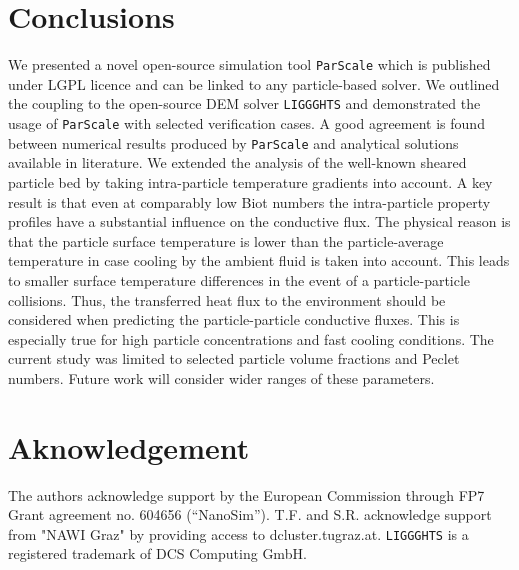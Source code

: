 \documentclass{particles2015}
\begin{document}
\section{Conclusions}
\label{sec:conclusions}

We presented a novel open-source simulation tool \texttt{ParScale} which is published under LGPL licence and can be linked to any particle-based solver. We outlined the coupling to the open-source DEM solver \texttt{LIGGGHTS}\textsuperscript{\textregistered} and demonstrated the usage of \texttt{ParScale} with selected verification cases. A good agreement is found between numerical results produced by \texttt{ParScale} and analytical solutions available in literature. We extended the analysis of the well-known sheared particle bed by taking intra-particle temperature gradients into account. A key result is that even at comparably low Biot numbers the intra-particle property profiles have a substantial influence on the conductive flux. The physical reason is that the particle surface temperature is lower than the particle-average temperature in case cooling by the ambient fluid is taken into account. This leads to smaller surface temperature differences in the event of a particle-particle collisions. Thus, the transferred heat flux to the environment should be considered when predicting the particle-particle conductive fluxes. This is especially true for high particle concentrations and fast cooling conditions. The current study was limited to selected particle volume fractions and Peclet numbers. Future work will consider wider ranges of these parameters. 

\section{Aknowledgement}
The authors acknowledge support by the European Commission through FP7 Grant agreement no. 604656 (“NanoSim”). T.F. and S.R. acknowledge support from "NAWI Graz" by providing access to dcluster.tugraz.at. \texttt{LIGGGHTS}\textsuperscript{\textregistered} is a registered trademark of DCS Computing GmbH.

\newpage

\end{document}

